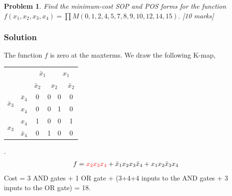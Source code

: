 \documentclass[twocolumn]{article}
\newtheorem{prob}{Problem}
\newcommand{\bx}{\bar{x}}
\newcommand{\cred}{\color{red}}
\begin{document}
\begin{prob}
Find the minimum-cost SOP and POS forms for the function $f(x_1 , x_2 , x_3,
x_4) = \prod M(0, 1, 2, 4, 5, 7, 8, 9, 10, 12, 14, 15).$ \cite[Prob
2.39]{brown2013fundamentals} [10 marks]
\end{prob}

\subsubsection*{Solution}

The function $f$ is zero at the maxterms. We draw the following K-map,
\\
\begin{tabular}{c|c|c|c|c|c}
  \toprule
  && \multicolumn{2}{c|}{$\bx_1$} & \multicolumn{2}{c}{$x_1$}
  \\
  && $\bx_2$ & \multicolumn{2}{c|}{$x_2$} & $\bx_2$
  \\ \midrule
  \multirow{2}{*}{$\bx_3$} & $\bx_4$
                                  & 0 & 0 & 0 & 0
  \\
  & $x_4$
                                  & 0 & 0 & 1 & 0
  \\
  \multirow{2}{*}{$x_3$}   &  $x_4$
                                  & \cred 1 & 0 & 0 & \cred 1
  \\
  & $\bx_4$
                                  & 0 & 1 & 0 & 0
  \\\bottomrule
\end{tabular}.
\\
\begin{align}
  f = {\cred x_2 x_3 x_4} + \bx_1 x_2  x_3 \bx_4 + x_1 x_2 \bx_3 x_4
\end{align}
Cost = 3 AND gates + 1 OR gate + (3+4+4 inputs to the AND gates + 3 inputs to the OR
gate) = 18.
\end{document}
